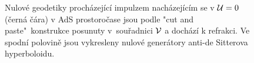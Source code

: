 \begin{figure}[H]
    \centering
    \caption{Nulové geodetiky procházející impulzem nacházejícím se v $\mathcal{U}=0$ (černá čára) v AdS prostoročase jsou podle "cut and paste"\ konstrukce posunuty
    v~souřadnici $\mathcal{V}$ a dochází k refrakci. Ve spodní polovině jsou vykresleny nulové generátory anti-de Sitterova hyperboloidu.}
\end{figure}

